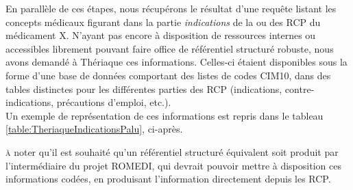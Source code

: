 \documentclass[a4paper, 12pt, openany, oneside, abstract=on]{article} %
\begin{document}
En parallèle de ces étapes, nous récupérons le résultat d'une requête listant les concepts médicaux figurant dans la partie \emph{indications} de la ou des RCP du médicament X. N'ayant pas encore à disposition de ressources internes ou accessibles librement pouvant faire office de référentiel structuré robuste, nous avons demandé à Thériaque ces informations. Celles-ci étaient disponibles sous la forme d'une base de données comportant des listes de codes CIM10, dans des tables distinctes pour les différentes parties des RCP (indications, contre-indications, précautions d'emploi, etc.).\label{ChoixThériaque}\\
Un exemple de représentation de ces informations est repris dans le tableau \ref{table:TheriaqueIndicationsPalu}, ci-après.

\begin{table}[H]
\centering
{}
\caption{Exemple des informations (dont codes CIM10) sur les indications de médicaments anti-palustres, tels que fournies par Thériaque}
\label{table:TheriaqueIndicationsPalu}
\end{table}


\textsc{à} noter qu'il est souhaité qu'un référentiel structuré équivalent soit produit par l'intermédiaire du projet ROMEDI\cite{Cossin2018}, qui devrait pouvoir mettre à disposition ces informations codées, en produisant l'information directement depuis les RCP.
\end{document}
